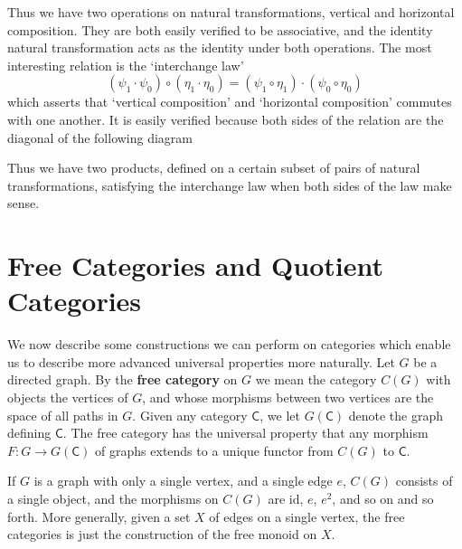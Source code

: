 Thus we have two operations on natural transformations, vertical and horizontal composition. They are both easily verified to be associative, and the identity natural transformation acts as the identity under both operations. The most interesting relation is the `interchange law'
%
\[ (\psi_1 \cdot \psi_0) \circ (\eta_1 \cdot \eta_0) = (\psi_1 \circ \eta_1) \cdot (\psi_0 \circ \eta_0) \]
%
which asserts that `vertical composition' and `horizontal composition' commutes with one another. It is easily verified because both sides of the relation are the diagonal of the following diagram
%
\begin{center}
\end{center}
%
Thus we have two products, defined on a certain subset of pairs of natural transformations, satisfying the interchange law when both sides of the law make sense. 

\section{Free Categories and Quotient Categories}

We now describe some constructions we can perform on categories which enable us to describe more advanced universal properties more naturally. Let $G$ be a directed graph. By the {\bf free category} on $G$ we mean the category $C(G)$ with objects the vertices of $G$, and whose morphisms between two vertices are the space of all paths in $G$. Given any category $\mathsf{C}$, we let $G(\mathsf{C})$ denote the graph defining $\mathsf{C}$. The free category has the universal property that any morphism $F: G \to G(\mathsf{C})$ of graphs extends to a unique functor from $C(G)$ to $\mathsf{C}$.

\begin{example}
    If $G$ is a graph with only a single vertex, and a single edge $e$, $C(G)$ consists of a single object, and the morphisms on $C(G)$ are $\text{id}$, $e$, $e^2$, and so on and so forth. More generally, given a set $X$ of edges on a single vertex, the free categories is just the construction of the free monoid on $X$.
\end{example}

